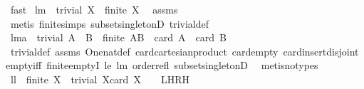 \begin{isabellebody}
\ fast%
\endisatagproof
{\isafoldproof}%
%
\isadelimproof
%
\endisadelimproof
\isanewline
\isanewline
{}\isamarkupfalse%
\ lm{}{}{\isacharcolon}\ \ {\isachardoublequoteopen}trivial\ X{\isachardoublequoteclose}\ \ {\isachardoublequoteopen}finite\ X{\isachardoublequoteclose}\ \isanewline
%
\isadelimproof
%
\endisadelimproof
%
\isatagproof
{}\isamarkupfalse%
\ assms\ \isamarkupfalse%
\ {\isacharparenleft}metis\ finite{\isachardot}simps\ subset{\isacharunderscore}singletonD\ trivial{\isacharunderscore}def{\isacharparenright}%
\endisatagproof
{\isafoldproof}%
%
\isadelimproof
\isanewline
%
\endisadelimproof
\isanewline
\isanewline
{}\isamarkupfalse%
\ lm{}{}{}a{\isacharcolon}\ \ {\isachardoublequoteopen}trivial\ {\isacharparenleft}A\ {\isasymtimes}\ B{\isacharparenright}{\isachardoublequoteclose}\ \ {\isachardoublequoteopen}{\isacharparenleft}finite\ {\isacharparenleft}A{\isasymtimes}B{\isacharparenright}\ {\isacharampersand}\ card\ A\ {\isacharasterisk}\ {\isacharparenleft}card\ B{\isacharparenright}\ {\isasymle}\ {}{\isacharparenright}{\isachardoublequoteclose}\ \isanewline
%
\isadelimproof
%
\endisadelimproof
%
\isatagproof
{}\isamarkupfalse%
\ trivial{\isacharunderscore}def\ assms\ One{\isacharunderscore}nat{\isacharunderscore}def\ card{\isacharunderscore}cartesian{\isacharunderscore}product\ card{\isacharunderscore}empty\ card{\isacharunderscore}insert{\isacharunderscore}disjoint\isanewline
empty{\isacharunderscore}iff\ finite{\isachardot}emptyI\ le{}\ lm{}{}\ order{\isacharunderscore}refl\ subset{\isacharunderscore}singletonD\ \isamarkupfalse%
\ {\isacharparenleft}metis{\isacharparenleft}no{\isacharunderscore}types{\isacharparenright}{\isacharparenright}%
\endisatagproof
{\isafoldproof}%
%
\isadelimproof
\isanewline
%
\endisadelimproof
\isanewline
{}\isamarkupfalse%
\ ll{}{}{\isacharcolon}\ \ {\isachardoublequoteopen}finite\ X{\isachardoublequoteclose}\ \ {\isachardoublequoteopen}trivial\ X{\isacharequal}{\isacharparenleft}card\ X\ {\isasymle}\ {}{\isacharparenright}{\isachardoublequoteclose}\ {\isacharparenleft}\ {\isachardoublequoteopen}{\isacharquery}LH{\isacharequal}{\isacharquery}RH{\isachardoublequoteclose}{\isacharparenright}\ \isanewline
%
\isadelimproof
%
\endisadelimproof

\end{isabellebody}
